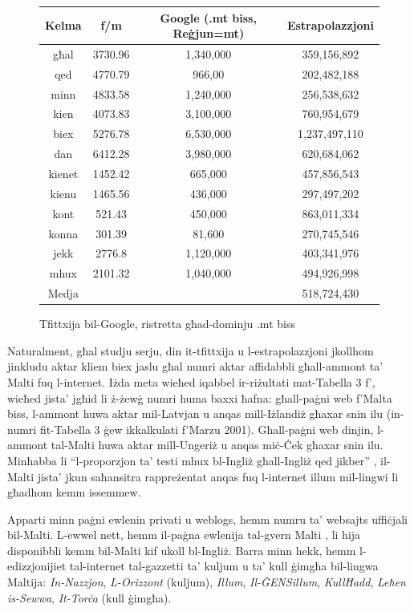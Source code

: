 \documentclass[]{../../metanetpaper}
\begin{document}
\begin{multicols}{2}
\begin{figure}[tb]
\centering
\begin{tabular}{|c|c|c|c|} %
\hline
Kelma & f/m & Google (.mt biss, Reġjun=mt) & Estrapolazzjoni \\
\hline
għal & 3730.96 & 1,340,000 & 359,156,892 \\
qed	& 4770.79 & 966,00  &  202,482,188  \\
minn & 4833.58 & 1,240,000  &  256,538,632 \\
kien & 4073.83 & 3,100,000  &  760,954,679 \\
biex & 5276.78 & 6,530,000  & 1,237,497,110 \\
dan	& 6412.28  & 3,980,000  & 620,684,062  \\
kienet & 1452.42  & 665,000 &  457,856,543 \\
kienu & 1465.56  & 436,000  & 297,497,202  \\
kont & 521.43  & 450,000  &  863,011,334 \\
konna & 301.39  & 81,600  &   270,745,546\\
jekk & 2776.8  &  1,120,000 & 403,341,976 \\
mhux & 2101.32  & 1,040,000  &  494,926,998 \\
\hline
Medja & & & 518,724,430 \\
\hline
\end{tabular} 
\caption{Tfittxija bil-Google, ristretta għad-dominju .mt biss}
\label{table:Google_B_mt}
\end{figure}

Naturalment, għal studju serju, din it-tfittxija u l-estrapolazzjoni jkollhom jinkludu aktar kliem biex jaslu għal numri aktar affidabbli għall-ammont ta’ Malti fuq l-internet. Iżda meta wieħed iqabbel ir-riżultati mat-Tabella 3 f’\cite{Kilgarriff-Grefenstette:2003}, wieħed jista’ jgħid li ż-żewġ numri huma baxxi ħafna: għall-paġni web f’Malta biss, l-ammont huwa aktar mil-Latvjan u anqas mill-Iżlandiż għaxar snin ilu (in-numri fit-Tabella 3 ġew ikkalkulati f’Marzu 2001). Għall-paġni web dinjin, l-ammont tal-Malti huwa aktar mill-Ungeriż u anqas miċ-Ċek għaxar snin ilu. Minħabba li ``l-proporzjon ta’ testi mhux bl-Ingliż għall-Ingliż qed jikber'' \cite{Kilgarriff-Grefenstette:2003}, il-Malti jista’ jkun saħansitra rappreżentat anqas fuq l-internet illum mil-lingwi li għadhom kemm issemmew.

Apparti minn paġni ewlenin privati u weblogs, hemm numru ta’ websajts uffiċjali bil-Malti. L-ewwel nett, hemm il-paġna ewlenija tal-gvern Malti \cite{GovernmentOfMalta1}, li hija disponibbli kemm bil-Malti kif ukoll bl-Ingliż. Barra minn hekk, hemm l-edizzjonijiet tal-internet tal-gazzetti ta’ kuljum u ta’ kull ġimgħa bil-lingwa Maltija: \emph{In-Nazzjon}, \emph{L-Orizzont} (kuljum), \emph{Illum}, \emph{Il-ĠENSillum}, \emph{KullĦadd}, \emph{Leħen is-Sewwa}, \emph{It-Torċa} (kull ġimgħa).


\end{multicols}
\end{document}
